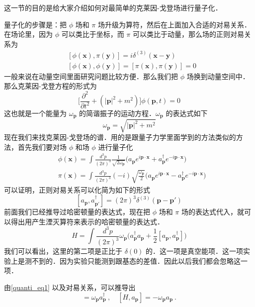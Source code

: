 这一节的目的是给大家介绍如何对最简单的克莱因-戈登场进行量子化．

量子化的步骤是：把 $\phi$ 场和 $\pi$ 场升级为算符，然后在上面加入合适的对易关系．在场论里，因为 $\phi$ 可以类比于坐标，而 $\pi$ 可以类比于动量，那么场的正则对易关系为
\begin{equation}
\begin{aligned}
& [\phi(\mathbf x),\pi(\mathbf y)] = i \delta^{(3)}(\mathbf x- \mathbf y) \\
& [\phi(\mathbf x),\phi(\mathbf y)]  = [\pi(\mathbf x),\pi(\mathbf y)] = 0
\end{aligned}
\end{equation}
一般来说在动量空间里面研究问题比较方便．那么我们把 $\phi$ 场换到动量空间中．那么克莱因-戈登方程的形式为
\begin{equation}
\bigg[\frac{\partial^2}{\partial t^2}+(|\mathbf p|^2+m^2)\bigg] \phi(\mathbf p, t) = 0
\end{equation}
这也就是一个能量为 $\omega_{\mathbf p}$ 的简谐振子的运动方程．$\omega_{\mathbf p}$ 的表达式如下
\begin{equation}
\omega_{\mathbf p} = \sqrt{|\mathbf p|^2+m^2}
\end{equation}
现在我们来找克莱因-戈登场的谱．用的是跟量子力学里面学到的方法类似的方法，首先我们要对场 $\phi$ 和场 $\phi$ 进行量子化
\begin{equation}
\begin{aligned}
& \phi(\mathbf x) = \int \frac{d^3p}{(2\pi)^3} \frac{1}{\sqrt{2\omega_{\mathbf p}}}\bigg( a_{\mathbf p} e^{i \mathbf p \cdot \mathbf x} + a_{\mathbf p}^\dagger e^{-i\mathbf p \cdot \mathbf x} \bigg) \\
& \pi(\mathbf x) = \int \frac{d^3p}{(2\pi)^3} (-i) \sqrt{\frac{\omega_{\mathbf p}}{2}} \bigg( a_{\mathbf p} e^{i \mathbf p \cdot \mathbf x} - a^{\dagger}_{\mathbf p} e^{-i \mathbf p \cdot \mathbf x} \bigg)
\end{aligned}
\end{equation}
可以证明，正则对易关系可以化简为如下的形式
\begin{equation}\label{quanti_eq2}
[a_{\mathbf p},a_{\mathbf p'}^\dagger] = (2\pi)^3 \delta^{(3)} (\mathbf p - \mathbf p')
\end{equation}
前面我们已经推导过哈密顿量的表达式，现在把 $\phi$ 场和 $\pi$ 场的表达式代入，就可以得出用产生湮灭算符来表示的哈密顿量的表达式．
\begin{equation}\label{quanti_eq1}
H = \int \frac{d^3p}{(2\pi)^3} \omega_{\mathbf p} \bigg(  a^\dagger_{\mathbf p} a_{\mathbf p} + \frac{1}{2} [a_{\mathbf p},a^\dagger_{\mathbf p}] \bigg)
\end{equation}
我们可以看出，这里的第二项是正比于 $\delta(0)$ 的．这一项是真空能项．这一项实验上是测不到的．因为实验只能测到跟基态的差值．因此以后我们都会忽略这一项．

由\autoref{quanti_eq1} 以及对易关系，可以推导出
\begin{equation}
[H,a_{\mathbf p}^\dagger] = \omega_{\mathbf p} a^\dagger_{\mathbf p}~, \quad [H,a_{\mathbf p}] = -\omega_{\mathbf p} a_{\mathbf p}~.
\end{equation}




